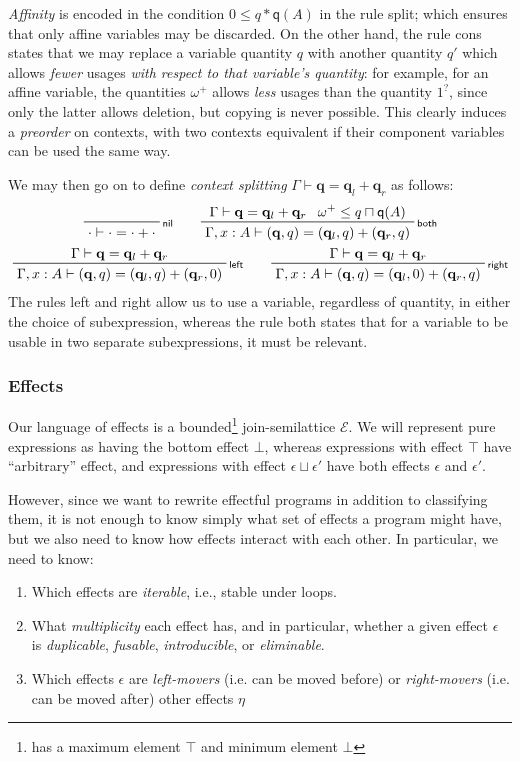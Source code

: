 \documentclass[acmsmall,screen,review]{acmart}
\newcommand{\mc}[1]{\ensuremath{\mathcal{#1}}}
\newcommand{\mb}[1]{\ensuremath{\mathbf{#1}}}
\newcommand{\ms}[1]{\ensuremath{\mathsf{#1}}}
\newcommand{\qsp}[4]{#1 \vdash #2 = #3 + #4}
\newcommand{\rle}[1]{{\scriptsize\textsf{#1}}}
\newcommand{\brle}[1]{{\textsf{#1}}}
\newcommand{\zeroq}{0}
\newcommand{\delq}{1^?}
\newcommand{\cpyq}{\omega^+}
\newcommand{\alquant}{\ms{q}}
\begin{document}
\emph{Affinity} is encoded in the condition $\zeroq \leq q * \alquant(A)$ in the rule \brle{split};
which ensures that only affine variables may be discarded. On the other hand, the rule \brle{cons}
states that we may replace a variable quantity $q$ with another quantity $q'$ which allows
\emph{fewer} usages \emph{with respect to that variable's quantity}: for example, for an affine
variable, the quantities $\cpyq$ allows \emph{less} usages than the quantity $\delq$, since only the
latter allows deletion, but copying is never possible. This clearly induces a \emph{preorder} on
contexts, with two contexts equivalent if their component variables can be used the same way.

We may then go on to define \emph{context splitting} $\qsp{\Gamma}{\mb{q}}{\mb{q}_l}{\mb{q}_r}$ as
follows:
\begin{gather*}
  \prftree[r]{\rle{nil}}
    {\qsp{\cdot}{\cdot}{\cdot}{\cdot}} \qquad
  \prftree[r]{\rle{both}}
    {\qsp{\Gamma}{\mb{q}}{\mb{q}_l}{\mb{q}_r}}
    {\cpyq \leq q \sqcap \alquant(A)}
    {\qsp{\Gamma, x : A}{(\mb{q}, q)}{(\mb{q}_l, q)}{(\mb{q}_r, q)}}
    \\
  \prftree[r]{\rle{left}}
    {\qsp{\Gamma}{\mb{q}}{\mb{q}_l}{\mb{q}_r}}
    {\qsp{\Gamma, x : A}{(\mb{q}, q)}{(\mb{q}_l, q)}{(\mb{q}_r, \zeroq)}} \qquad
  \prftree[r]{\rle{right}}
    {\qsp{\Gamma}{\mb{q}}{\mb{q}_l}{\mb{q}_r}}
    {\qsp{\Gamma, x : A}{(\mb{q}, q)}{(\mb{q}_l, \zeroq)}{(\mb{q}_r, q)}}
\end{gather*}
The rules \brle{left} and \brle{right} allow us to use a variable, regardless of quantity, in either
the choice of subexpression, whereas the rule \brle{both} states that for a variable to be usable in
two separate subexpressions, it must be relevant.

\subsubsection{Effects}
Our language of effects is a bounded\footnote{has a maximum element $\top$ and minimum element
$\bot$} join-semilattice $\mc{E}$. We will represent pure expressions as having the bottom effect
$\bot$, whereas expressions with effect $\top$ have ``arbitrary'' effect, and expressions with
effect $\epsilon \sqcup \epsilon'$ have both effects $\epsilon$ and $\epsilon'$.

However, since we want to rewrite effectful programs in addition to classifying them, it is not
enough to know simply what set of effects a program might have, but we also need to know how effects
interact with each other. In particular, we need to know:
\begin{enumerate}
  \item Which effects are \emph{iterable}, i.e., stable under loops. 
  \item What \emph{multiplicity} each effect has, and in particular, whether a given effect
  $\epsilon$ is \emph{duplicable}, \emph{fusable}, \emph{introducible}, or \emph{eliminable}.
  \item Which effects $\epsilon$ are \emph{left-movers} (i.e. can be moved before) or
  \emph{right-movers} (i.e. can be moved after) other effects $\eta$
\end{enumerate}
\end{document}
